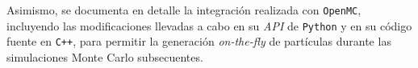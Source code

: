 Asimismo, se documenta en detalle la integración realizada con \texttt{OpenMC}, incluyendo las modificaciones llevadas a cabo en su \textit{API} de \texttt{Python} y en su código fuente en \texttt{C++}, para permitir la generación \textit{on-the-fly} de partículas durante las simulaciones Monte Carlo subsecuentes.






